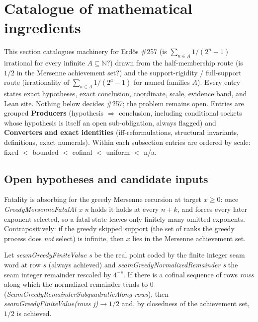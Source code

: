 \section{Catalogue of mathematical ingredients}

This section catalogues machinery for Erd\H{o}s \#257 (is $\sum_{n\in A} 1/(2^n-1)$
irrational for every infinite $A\subseteq\mathbb{N}$?) drawn from the half-membership
route (is $1/2$ in the Mersenne achievement set?) and the support-rigidity /
full-support route (irrationality of $\sum_{a\in A} 1/(2^a-1)$ for named families $A$).
Every entry states exact hypotheses, exact conclusion, coordinate, scale, evidence band,
and Lean site. Nothing below decides \#257; the problem remains open. Entries are grouped
\textbf{Producers} (hypothesis $\Rightarrow$ conclusion, including conditional sockets
whose hypothesis is itself an open sub-obligation, always flagged) and \textbf{Converters
and exact identities} (iff-reformulations, structural invariants, definitions, exact
numerals). Within each subsection entries are ordered by scale:
fixed $<$ bounded $<$ cofinal $<$ uniform $<$ n/a.

\subsection{Open hypotheses and candidate inputs}

\begin{thm}
\label{thm:fatal-absorbing}
Fatality is absorbing for the greedy Mersenne recursion at target $x\ge 0$: once
\emph{GreedyMersenneFatalAt x n} holds it holds at every $n+k$, and forces every later
exponent selected, so a fatal state leaves only finitely many omitted exponents.
Contrapositively: if the greedy skipped support (the set of ranks the greedy process
does \emph{not} select) is infinite, then $x$ lies in the Mersenne achievement set.
\par{}
\end{thm}

\begin{thm}
\label{thm:seam-limit}
Let \emph{seamGreedyFiniteValue s} be the real point coded by the finite integer seam
word at row $s$ (always achieved) and \emph{seamGreedyNormalizedRemainder s} the seam
integer remainder rescaled by $4^{-s}$. If there is a cofinal sequence of rows
\emph{rows} along which the normalized remainder tends to $0$
(\emph{SeamGreedyRemainderSubquadraticAlong rows}), then
\emph{seamGreedyFiniteValue(rows j)}$\to 1/2$ and, by closedness of the achievement set,
$1/2$ is achieved.
\par{}
\end{thm}

